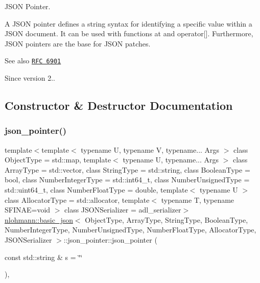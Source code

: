 J\+S\+ON Pointer. 

A J\+S\+ON pointer defines a string syntax for identifying a specific value within a J\+S\+ON document. It can be used with functions {\ttfamily at} and {\ttfamily operator\mbox{[}\mbox{]}}. Furthermore, J\+S\+ON pointers are the base for J\+S\+ON patches.

\begin{DoxySeeAlso}{See also}
\href{https://tools.ietf.org/html/rfc6901}{\tt R\+FC 6901}
\end{DoxySeeAlso}
\begin{DoxySince}{Since}
version 2.. 
\end{DoxySince}


\subsection{Constructor \& Destructor Documentation}
\mbox{\label{classnlohmann_1_1basic__json_1_1json__pointer_abaa66b0d30811b8a8670a673c686b75a}} 
\subsubsection{\texorpdfstring{json\+\_\+pointer()}{json\_pointer()}}
{\footnotesize\ttfamily template$<$template$<$ typename U, typename V, typename... Args $>$ class Object\+Type = std\+::map, template$<$ typename U, typename... Args $>$ class Array\+Type = std\+::vector, class String\+Type  = std\+::string, class Boolean\+Type  = bool, class Number\+Integer\+Type  = std\+::int64\+\_\+t, class Number\+Unsigned\+Type  = std\+::uint64\+\_\+t, class Number\+Float\+Type  = double, template$<$ typename U $>$ class Allocator\+Type = std\+::allocator, template$<$ typename T, typename S\+F\+I\+N\+A\+E=void $>$ class J\+S\+O\+N\+Serializer = adl\+\_\+serializer$>$ \\
\hyperlink{classnlohmann_1_1basic__json}{nlohmann\+::basic\+\_\+json}$<$ Object\+Type, Array\+Type, String\+Type, Boolean\+Type, Number\+Integer\+Type, Number\+Unsigned\+Type, Number\+Float\+Type, Allocator\+Type, J\+S\+O\+N\+Serializer $>$\+::json\+\_\+pointer\+::json\+\_\+pointer (\begin{DoxyParamCaption}\item[{const std\+::string \&}]{s = {\ttfamily \char`\"{}\char`\"{}} }\end{DoxyParamCaption})\hspace{0.3cm}{\ttfamily [inline]}, {\ttfamily [explicit]}}



